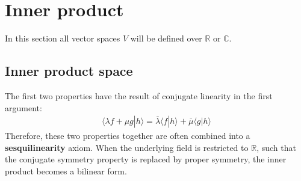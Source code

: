 \section{Inner product}\label{section:innerproduct}

    In this section all vector spaces $V$ will be defined over $\mathbb{R}$ or $\mathbb{C}$.

\subsection{Inner product space}

    \begin{result}
        The first two properties have the result of conjugate linearity in the first argument:
        \begin{gather}
            \langle \lambda f + \mu g|h \rangle = \overline{\lambda}\langle f|h \rangle + \overline{\mu}\langle g|h \rangle
        \end{gather}
        Therefore, these two properties together are often combined into a \textbf{sesquilinearity} axiom. When the underlying field is restricted to $\mathbb{R}$, such that the conjugate symmetry property is replaced by proper symmetry, the inner product becomes a bilinear form.
    \end{result}


